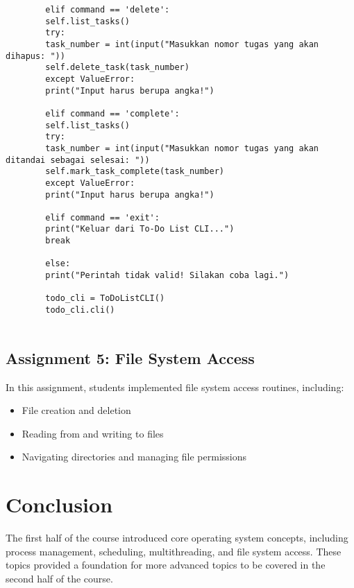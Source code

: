 \documentclass[12pt]{article}
\begin{document}
\begin{lstlisting}
		elif command == 'delete':
		self.list_tasks()
		try:
		task_number = int(input("Masukkan nomor tugas yang akan dihapus: "))
		self.delete_task(task_number)
		except ValueError:
		print("Input harus berupa angka!")
		
		elif command == 'complete':
		self.list_tasks()
		try:
		task_number = int(input("Masukkan nomor tugas yang akan ditandai sebagai selesai: "))
		self.mark_task_complete(task_number)
		except ValueError:
		print("Input harus berupa angka!")
		
		elif command == 'exit':
		print("Keluar dari To-Do List CLI...")
		break
		
		else:
		print("Perintah tidak valid! Silakan coba lagi.")
		
		todo_cli = ToDoListCLI()
		todo_cli.cli()
		
	\end{lstlisting}
	\subsection{Assignment 5: File System Access}
	In this assignment, students implemented file system access routines, including:
	
	\begin{itemize}
		\item File creation and deletion
		\item Reading from and writing to files
		\item Navigating directories and managing file permissions
	\end{itemize}
	
	\section{Conclusion}
	The first half of the course introduced core operating system concepts, including process management, scheduling, multithreading, and file system access. These topics provided a foundation for more advanced topics to be covered in the second half of the course.
	
\end{document}
